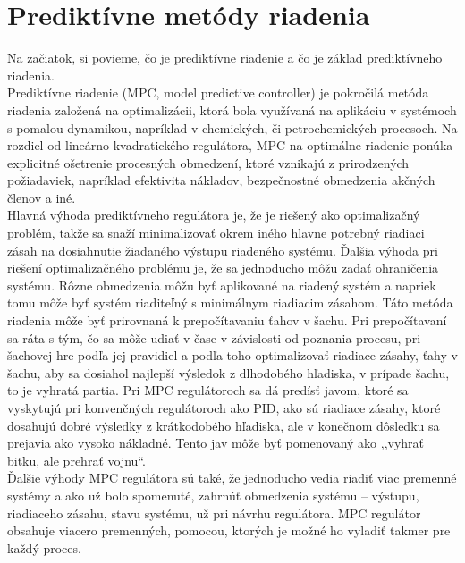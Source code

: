 \section{Prediktívne metódy riadenia}
Na začiatok, si povieme, čo je prediktívne riadenie a čo je základ prediktívneho riadenia.\\
\indent Prediktívne riadenie (MPC, model predictive controller) je pokročilá metóda riadenia založená na optimalizácii, ktorá bola využívaná na aplikáciu v systémoch s pomalou dynamikou, napríklad v chemických, či petrochemických procesoch. Na rozdiel od lineárno-kvadratického regulátora, MPC na optimálne riadenie ponúka explicitné ošetrenie procesných obmedzení, ktoré vznikajú z prirodzených požiadaviek, napríklad efektivita nákladov, bezpečnostné obmedzenia akčných členov a iné.\cite{MPC01} \\
\indent Hlavná výhoda prediktívneho regulátora je, že je riešený ako optimalizačný problém, takže sa snaží minimalizovať okrem iného hlavne potrebný riadiaci zásah na dosiahnutie žiadaného výstupu riadeného systému. Ďalšia výhoda pri riešení optimalizačného problému je, že sa jednoducho môžu zadať ohraničenia systému. Rôzne obmedzenia môžu byť aplikované na riadený systém a napriek tomu môže byť systém riaditeľný s minimálnym riadiacim zásahom. Táto metóda riadenia môže byť prirovnaná k prepočítavaniu ťahov v šachu. Pri prepočítavaní sa ráta s tým, čo sa môže udiať v čase v závislosti od poznania procesu, pri šachovej hre podľa jej pravidiel a podľa toho optimalizovať riadiace zásahy, ťahy v šachu, aby sa dosiahol najlepší výsledok z dlhodobého hľadiska, v prípade šachu, to je vyhratá partia. Pri MPC regulátoroch sa dá predísť javom, ktoré sa vyskytujú pri konvenčných regulátoroch ako PID, ako sú riadiace zásahy, ktoré dosahujú dobré výsledky z krátkodobého hľadiska, ale v konečnom dôsledku sa prejavia ako vysoko nákladné. Tento jav môže byť pomenovaný ako ,,vyhrať bitku, ale prehrať vojnu``. \\ 
\indent Ďalšie výhody MPC regulátora sú také, že jednoducho vedia riadiť viac premenné systémy a ako už bolo spomenuté, zahrnúť obmedzenia systému – výstupu, riadiaceho zásahu, stavu systému, už pri návrhu regulátora. MPC regulátor obsahuje viacero premenných, pomocou, ktorých je možné ho vyladiť takmer pre každý proces. \\
